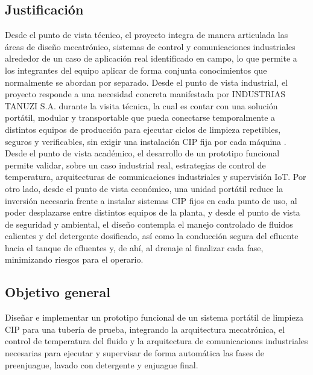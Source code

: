 \subsection{Justificación}
{Desde el punto de vista técnico, el proyecto integra de manera articulada las áreas de diseño mecatrónico, sistemas de control y comunicaciones industriales alrededor de un caso de aplicación real identificado en campo, lo que permite a los integrantes del equipo aplicar de forma conjunta conocimientos que normalmente se abordan por separado. Desde el punto de vista industrial, el proyecto responde a una necesidad concreta manifestada por INDUSTRIAS TANUZI S.A. durante la visita técnica, la cual es contar con una solución portátil, modular y transportable que pueda conectarse temporalmente a distintos equipos de producción para ejecutar ciclos de limpieza repetibles, seguros y verificables, sin exigir una instalación CIP fija por cada máquina \cite{pi_institucional}. Desde el punto de vista académico, el desarrollo de un prototipo funcional permite validar, sobre un caso industrial real, estrategias de control de temperatura, arquitecturas de comunicaciones industriales y supervisión IoT. Por otro lado, desde el punto de vista económico, una unidad portátil reduce la inversión necesaria frente a instalar sistemas CIP fijos en cada punto de uso, al poder desplazarse entre distintos equipos de la planta, y desde el punto de vista de seguridad y ambiental, el diseño contempla el manejo controlado de fluidos calientes y del detergente dosificado, así como la conducción segura del efluente hacia el tanque de efluentes y, de ahí, al drenaje al finalizar cada fase, minimizando riesgos para el operario.}

\subsection{Objetivo general}
{Diseñar e implementar un prototipo funcional de un sistema portátil de limpieza CIP para una tubería de prueba, integrando la arquitectura mecatrónica, el control de temperatura del fluido y la arquitectura de comunicaciones industriales necesarias para ejecutar y supervisar de forma automática las fases de preenjuague, lavado con detergente y enjuague final.}

